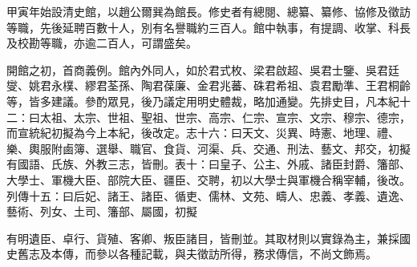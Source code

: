 
\begin{pinyinscope}
甲寅年始設清史館，以趙公爾巽為館長。修史者有總閱、總纂、纂修、協修及徵訪等職，先後延聘百數十人，別有名譽職約三百人。館中執事，有提調、收掌、科長及校勘等職，亦逾二百人，可謂盛矣。

開館之初，首商義例。館內外同人，如於君式枚、梁君啟超、吳君士鑒、吳君廷燮、姚君永樸、繆君荃孫、陶君葆廉、金君兆蕃、硃君希祖、袁君勵準、王君桐齡等，皆多建議。參酌眾見，後乃議定用明史體裁，略加通變。先排史目，凡本紀十二：曰太祖、太宗、世祖、聖祖、世宗、高宗、仁宗、宣宗、文宗、穆宗、德宗，而宣統紀初擬為今上本紀，後改定。志十六：曰天文、災異、時憲、地理、禮、樂、輿服附鹵簿、選舉、職官、食貨、河渠、兵、交通、刑法、藝文、邦交，初擬有國語、氏族、外教三志，皆刪。表十：曰皇子、公主、外戚、諸臣封爵、籓部、大學士、軍機大臣、部院大臣、疆臣、交聘，初以大學士與軍機合稱宰輔，後改。列傳十五：曰后妃、諸王、諸臣、循吏、儒林、文苑、疇人、忠義、孝義、遺逸、藝術、列女、土司、籓部、屬國，初擬

有明遺臣、卓行、貨殖、客卿、叛臣諸目，皆刪並。其取材則以實錄為主，兼採國史舊志及本傳，而參以各種記載，與夫徵訪所得，務求傳信，不尚文飾焉。


\end{pinyinscope}
